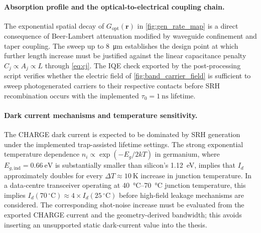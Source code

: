 \paragraph{Absorption profile and the optical-to-electrical coupling chain.}
The exponential spatial decay of $G_{\mathrm{opt}}(\mathbf{r})$ in
\cref{fig:gen_rate_map} is a direct consequence of Beer-Lambert attenuation
modified by waveguide confinement and taper coupling. The sweep up to
\SI{8}{\micro\metre} establishes the design point at which further length
increase must be justified against the linear capacitance penalty
$C_j\propto A_j\propto L$ through \cref{eq:cj}. The IQE check exported by the
post-processing script verifies whether the electric field of
\cref{fig:band_carrier_field} is sufficient to sweep photogenerated carriers to
their respective contacts before SRH recombination occurs with the implemented
$\tau_0=\SI{1}{\nano\second}$ lifetime.

\paragraph{Dark current mechanisms and temperature sensitivity.}
The CHARGE dark current is expected to be dominated by SRH generation under the
implemented trap-assisted lifetime settings. The strong exponential temperature
dependence $n_i\propto\exp(-E_g/2kT)$
in germanium, where $E_{g,\mathrm{ind}}=\SI{0.66}{\electronvolt}$ is
substantially smaller than silicon's \SI{1.12}{\electronvolt}, implies that
$I_d$ approximately doubles for every $\Delta T\approx\SI{10}{\kelvin}$
increase in junction temperature. In a data-centre transceiver operating at
\SIrange{40}{70}{\celsius} junction temperature, this implies
$I_d(70\,^\circ\mathrm{C})\approx4\times I_d(25\,^\circ\mathrm{C})$ before
high-field leakage mechanisms are considered. The corresponding shot-noise
increase must be evaluated from the exported CHARGE current and the
geometry-derived bandwidth; this avoids inserting an unsupported static
dark-current value into the thesis.

